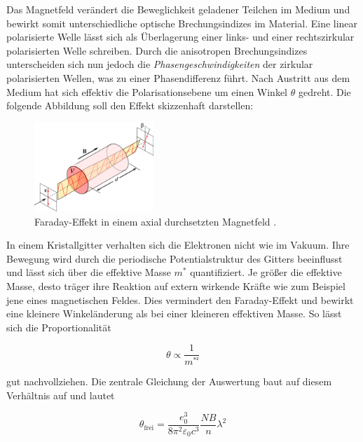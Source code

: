 \noindent Das Magnetfeld verändert die Beweglichkeit geladener Teilchen im Medium und bewirkt somit unterschiedliche optische Brechungsindizes
im Material. Eine linear polarisierte Welle lässt sich als Überlagerung einer links- und einer rechtszirkular polarisierten Welle schreiben. 
Durch die anisotropen Brechungsindizes unterscheiden sich nun jedoch die \textit{Phasengeschwindigkeiten} der zirkular polarisierten Wellen, 
was zu einer Phasendifferenz führt. Nach Austritt aus dem Medium hat sich effektiv die Polarisationsebene um einen Winkel $\theta$ gedreht. 
Die folgende Abbildung soll den Effekt skizzenhaft darstellen:

\begin{figure}[H]
    \centering
    \includegraphics[width=0.4\textwidth]{content/Faraday.png}
    \caption{Faraday-Effekt in einem axial durchsetzten Magnetfeld \cite{Faraday}.}
    \label{fig:Faraday}
\end{figure}

\noindent In einem Kristallgitter verhalten sich die Elektronen nicht wie im Vakuum. Ihre Bewegung wird durch die periodische Potentialstruktur
des Gitters beeinflusst und lässt sich über die effektive Masse $m^{\ast}$ quantifiziert. Je größer die effektive Masse, desto träger 
ihre Reaktion auf extern wirkende Kräfte wie zum Beispiel jene eines magnetischen Feldes. Dies vermindert den Faraday-Effekt und bewirkt 
eine kleinere Winkeländerung als bei einer kleineren effektiven Masse. So lässt sich die Proportionalität

\begin{equation}
    \theta \propto \frac{1}{m^{\ast²}}
\end{equation}

\noindent gut nachvollziehen. Die zentrale Gleichung der Auswertung baut auf diesem Verhältnis auf und lautet

\begin{equation}
    \theta_\text{frei} = \frac{e_0^3}{8 \pi ^2 \varepsilon_0c^3} \frac{NB}{n} \lambda ^2
    \label{eqn:Winkel_frei}
\end{equation}

